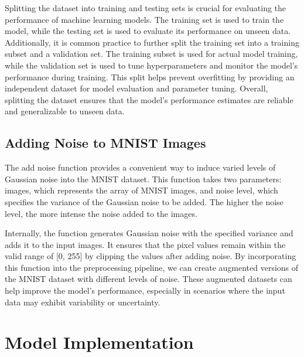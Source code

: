 Splitting the dataset into training and testing sets is crucial for evaluating the performance of machine learning models. The training set is used to train the model, while the testing set is used to evaluate its performance on unseen data. Additionally, it is common practice to further split the training set into a training subset and a validation set. The training subset is used for actual model training, while the validation set is used to tune hyperparameters and monitor the model's performance during training. This split helps prevent overfitting by providing an independent dataset for model evaluation and parameter tuning. Overall, splitting the dataset ensures that the model's performance estimates are reliable and generalizable to unseen data.


\subsection{Adding Noise to MNIST Images}

The add noise function provides a convenient way to induce varied levels of Gaussian noise into the MNIST dataset. This function takes two parameters: images, which represents the array of MNIST images, and noise level, which specifies the variance of the Gaussian noise to be added. The higher the noise level, the more intense the noise added to the images.

Internally, the function generates Gaussian noise with the specified variance and adds it to the input images. It ensures that the pixel values remain within the valid range of [0, 255] by clipping the values after adding noise.
By incorporating this function into the preprocessing pipeline, we can create augmented versions of the MNIST dataset with different levels of noise. These augmented datasets can help improve the model's performance, especially in scenarios where the input data may exhibit variability or uncertainty.

\section{Model Implementation}

